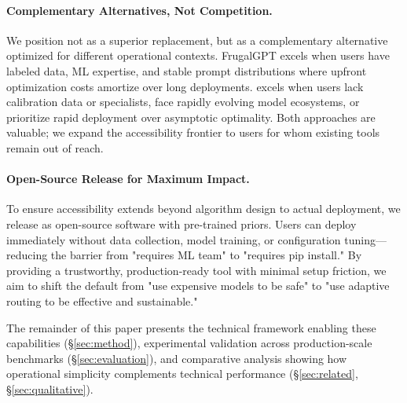\paragraph{Complementary Alternatives, Not Competition.} We position \ours{} not as a superior replacement, but as a complementary alternative optimized for different operational contexts. FrugalGPT excels when users have labeled data, ML expertise, and stable prompt distributions where upfront optimization costs amortize over long deployments. \ours{} excels when users lack calibration data or specialists, face rapidly evolving model ecosystems, or prioritize rapid deployment over asymptotic optimality. Both approaches are valuable; we expand the accessibility frontier to users for whom existing tools remain out of reach.

\paragraph{Open-Source Release for Maximum Impact.} To ensure accessibility extends beyond algorithm design to actual deployment, we release \ours{} as open-source software with pre-trained priors. Users can deploy immediately without data collection, model training, or configuration tuning---reducing the barrier from "requires ML team" to "requires pip install." By providing a trustworthy, production-ready tool with minimal setup friction, we aim to shift the default from "use expensive models to be safe" to "use adaptive routing to be effective and sustainable."

The remainder of this paper presents the technical framework enabling these capabilities (\S\ref{sec:method}), experimental validation across production-scale benchmarks (\S\ref{sec:evaluation}), and comparative analysis showing how operational simplicity complements technical performance (\S\ref{sec:related}, \S\ref{sec:qualitative}).

